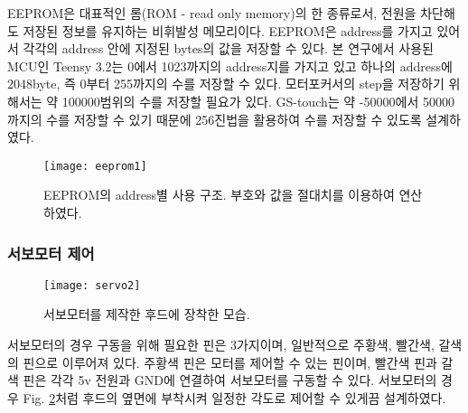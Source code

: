 EEPROM은 대표적인 롬(ROM - read only memory)의 한 종류로서, 전원을 차단해도 저장된 정보를 유지하는 비휘발성 메모리이다. EEPROM은 address를 가지고 있어서 각각의 address 안에 지정된 bytes의 값을 저장할 수 있다. 본 연구에서 사용된 MCU인 Teensy 3.2는 0에서 1023까지의 address지를 가지고 있고 하나의 address에 2048byte, 즉 0부터 255까지의 수를 저장할 수 있다. 모터포커서의 step을 저장하기 위해서는 약 100000범위의 수를 저장할 필요가 있다. GS-touch는 약 -50000에서 50000까지의 수를 저장할 수 있기 때문에 256진법을 활용하여 수를 저장할 수 있도록 설계하였다.
\begin{figure}[h]
	\begin{center}
		\texttt{[image: eeprom1]}
	\end{center}
	\caption{EEPROM의 address별 사용 구조. 부호와 값을 절대치를 이용하여 연산하였다.}
	\label{eeprom1}
\end{figure}




\subsubsection{서보모터 제어}

\begin{comment}
\begin{figure}[h]
\begin{center}
\begin{tikzpicture}
\node[anchor=south west,inner sep=0] at (0,0) 
{
\texttt{[image: servo1]}
\texttt{[image: servo2]} 
};
\draw (0.3, 5.7) node {(a)};
\draw (6.4, 5.7) node {(b)};
\end{tikzpicture}
\end{center}
\caption{(a) 사용한 서보모터인 ds lx3325mg 25kg와 (b) 이를 제작한 덮개에 장착한 모습.}
\label{motor2}
\end{figure}
\end{comment}

\begin{figure}[h]
	\begin{center}
		\texttt{[image: servo2]}
	\end{center}
	\caption{서보모터를 제작한 후드에 장착한 모습.}
	\label{motorcover}
\end{figure}

서보모터의 경우 구동을 위해 필요한 핀은 3가지이며, 일반적으로 주황색, 빨간색, 갈색의 핀으로 이루어져 있다. 주황색 핀은 모터를 제어할 수 있는 핀이며, 빨간색 핀과 갈색 핀은 각각 5v 전원과 GND에 연결하여 서보모터를 구동할 수 있다. 서보모터의 경우 Fig. \ref{motorcover}처럼 후드의 옆면에 부착시켜 일정한 각도로 제어할 수 있게끔 설계하였다.



